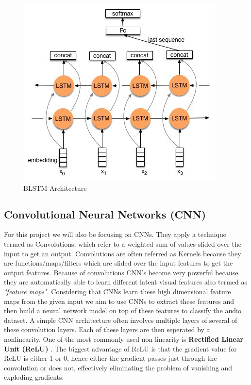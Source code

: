 \documentclass[letterpaper, 12 pt, conference]{ieeeconf}  %
\begin{document}
\begin{figure}[!h]
\centering
\includegraphics[scale=0.50]{../figs/blstm/diagram.jpeg}	
\caption{BLSTM Architecture}
\label{fig:BLSTM_Arch} 
\end{figure}


\subsection{Convolutional Neural Networks (CNN)}
For this project we will also be focusing on CNNs. They apply a technique termed as Convolutions, which refer to a weighted sum of values slided over the input to get an output. Convolutions are often referred as Kernels because they are functions/maps/filters which are slided over the input features to get the output features. Because of convolutions CNN's become very powerful because they are automatically able to learn different latent visual features also termed as \textit{"feature maps"}. Considering that CNNs learn these high dimensional feature maps from the given input we aim to use CNNs to extract these features and then build a neural network model on top of these features to classify the audio dataset. A simple CNN architecture often involves multiple layers of several of these convolution layers. Each of these layers are then seperated by a nonlinearity. One of the most commonly used non linearity is \textbf{Rectified Linear Unit (ReLU)} \cite{imagenet_original}. The biggest advantage of ReLU is that the gradient value for ReLU is either $1$ or $0$, hence either the gradient passes just through the convolution or does not, effectively eliminating the problem of vanishing and exploding gradients.
\end{document}
